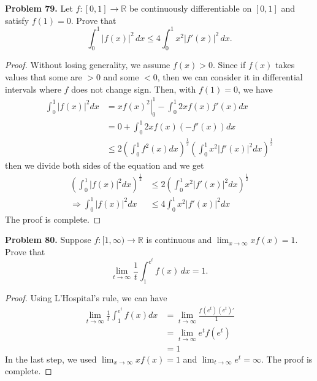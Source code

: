 \documentclass[12pt,leqno]{amsart}
\begin{document}
\medskip

\noindent
{\bf Problem 79.}
Let $f:[0,1]\to\mathbb{R}$ be continuously differentiable on $[0,1]$ and satisfy $f(1)=0$. Prove that
$$
\int_0^1 |f(x)|^2\, dx\leq 4\int_0^1 x^2|f'(x)|^2\, dx.
$$
\begin{proof}
Without losing generality, we assume $f(x)>0$. Since if $f(x)$ takes values that some are $>0$ and some $<0$, then we can consider it in differential intervals where $f$ does not change sign. Then, with $f(1) = 0$, we have 
\begin{align*}
    \int_0^1 |f(x)|^2 dx & = \left. xf(x)^2 \right|^1_0 - \int^1_0 2x f(x) f'(x) dx \\
    & = 0 + \int^1_0 2x f(x) (-f'(x)) dx \\
    & \leq 2 \left(\int^1_0 f^2(x) dx \right)^{\frac{1}{2}} \left(\int^1_0 x^2 |f'(x)|^2 dx \right)^{\frac{1}{2}}
\end{align*}
then we divide both sides of the equation and we get 
\begin{align*}
    \left(\int_0^1 |f(x)|^2 dx \right)^{\frac{1}{2}} & \leq 2 \left(\int^1_0 x^2 |f'(x)|^2 dx \right)^{\frac{1}{2}}\\
    \Rightarrow \int_0^1 |f(x)|^2 dx & \leq 4 \int^1_0 x^2 |f'(x)|^2 dx
\end{align*}
The proof is complete.
\end{proof}

\medskip

\noindent
{\bf Problem 80.}
Suppose $f:[1,\infty)\to\mathbb{R}$ is continuous and $\lim_{x\to\infty} xf(x)=1$. Prove that
$$
\lim_{t\to\infty}\frac{1}{t}\int_1^{e^t}f(x)\, dx=1.
$$
\begin{proof}
Using L'Hospital's rule, we can have 
\begin{align*}
    \lim_{t\to\infty}\frac{1}{t}\int_1^{e^t}f(x) dx & = \lim_{t\to\infty}\frac{f(e^t)(e^t)'}{1} \\
    & = \lim_{t\to\infty} e^t f(e^t) \\
    & = 1
\end{align*}
In the last step, we used $\lim_{x\to\infty}xf(x)=1$ and $\lim_{t\to\infty}e^t = \infty$. The proof is complete.
\end{proof}

\medskip
\end{document}

